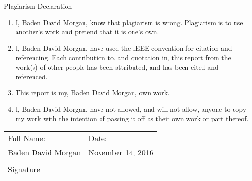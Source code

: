 \documentclass[a4paper,11pt]{article}
\numberwithin{figure}{section}
\numberwithin{table}{section}
\begin{document}
	\thispagestyle{empty}
	{\huge Plagiarism Declaration \par}
	\begin{enumerate}
  		\item I, Baden David Morgan, know that plagiarism is wrong. Plagiarism is to use another’s work and pretend
			that it is one’s own.
 		\item I, Baden David Morgan, have used the IEEE convention for citation and referencing. Each contribution to,
			and quotation in, this report from the work(s) of other people has been attributed,
			and has been cited and referenced.
 		\item This report is my, Baden David Morgan, own work.
 		\item	I, Baden David Morgan, have not allowed, and will not allow, anyone to copy my work with the intention
			of passing it off as their own work or part thereof.
	\end{enumerate}
		\noindent\begin{tabular}{ll}
		Full Name: & Date:\\%
		Baden David Morgan & November 14, 2016\\[8ex]
		
		\makebox[2.5in]{\hrulefill} \\
		Signature \\[8ex]%
	\end{tabular}
	\newpage
	
	
\end{document}
